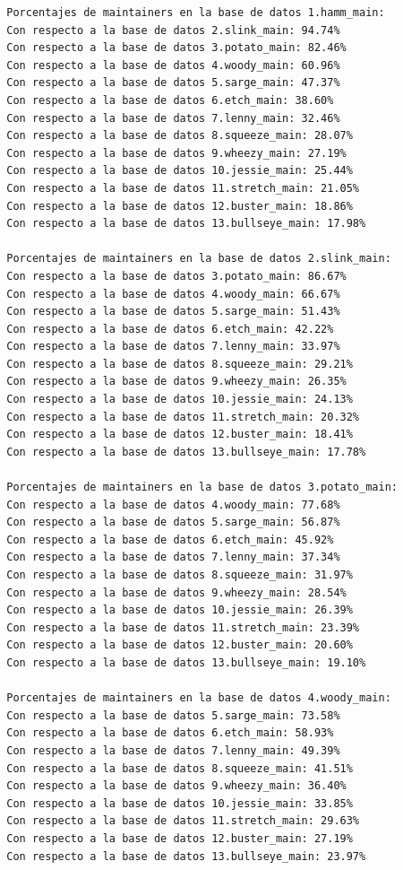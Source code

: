 \documentclass[a4paper, 12pt]{book}
\begin{document}
	\begin{verbatim}
		Porcentajes de maintainers en la base de datos 1.hamm_main:
		Con respecto a la base de datos 2.slink_main: 94.74%
		Con respecto a la base de datos 3.potato_main: 82.46%
		Con respecto a la base de datos 4.woody_main: 60.96%
		Con respecto a la base de datos 5.sarge_main: 47.37%
		Con respecto a la base de datos 6.etch_main: 38.60%
		Con respecto a la base de datos 7.lenny_main: 32.46%
		Con respecto a la base de datos 8.squeeze_main: 28.07%
		Con respecto a la base de datos 9.wheezy_main: 27.19%
		Con respecto a la base de datos 10.jessie_main: 25.44%
		Con respecto a la base de datos 11.stretch_main: 21.05%
		Con respecto a la base de datos 12.buster_main: 18.86%
		Con respecto a la base de datos 13.bullseye_main: 17.98%
		
		Porcentajes de maintainers en la base de datos 2.slink_main:
		Con respecto a la base de datos 3.potato_main: 86.67%
		Con respecto a la base de datos 4.woody_main: 66.67%
		Con respecto a la base de datos 5.sarge_main: 51.43%
		Con respecto a la base de datos 6.etch_main: 42.22%
		Con respecto a la base de datos 7.lenny_main: 33.97%
		Con respecto a la base de datos 8.squeeze_main: 29.21%
		Con respecto a la base de datos 9.wheezy_main: 26.35%
		Con respecto a la base de datos 10.jessie_main: 24.13%
		Con respecto a la base de datos 11.stretch_main: 20.32%
		Con respecto a la base de datos 12.buster_main: 18.41%
		Con respecto a la base de datos 13.bullseye_main: 17.78%
		
		Porcentajes de maintainers en la base de datos 3.potato_main:
		Con respecto a la base de datos 4.woody_main: 77.68%
		Con respecto a la base de datos 5.sarge_main: 56.87%
		Con respecto a la base de datos 6.etch_main: 45.92%
		Con respecto a la base de datos 7.lenny_main: 37.34%
		Con respecto a la base de datos 8.squeeze_main: 31.97%
		Con respecto a la base de datos 9.wheezy_main: 28.54%
		Con respecto a la base de datos 10.jessie_main: 26.39%
		Con respecto a la base de datos 11.stretch_main: 23.39%
		Con respecto a la base de datos 12.buster_main: 20.60%
		Con respecto a la base de datos 13.bullseye_main: 19.10%
		
		Porcentajes de maintainers en la base de datos 4.woody_main:
		Con respecto a la base de datos 5.sarge_main: 73.58%
		Con respecto a la base de datos 6.etch_main: 58.93%
		Con respecto a la base de datos 7.lenny_main: 49.39%
		Con respecto a la base de datos 8.squeeze_main: 41.51%
		Con respecto a la base de datos 9.wheezy_main: 36.40%
		Con respecto a la base de datos 10.jessie_main: 33.85%
		Con respecto a la base de datos 11.stretch_main: 29.63%
		Con respecto a la base de datos 12.buster_main: 27.19%
		Con respecto a la base de datos 13.bullseye_main: 23.97%
		

\end{verbatim}
\end{document}

